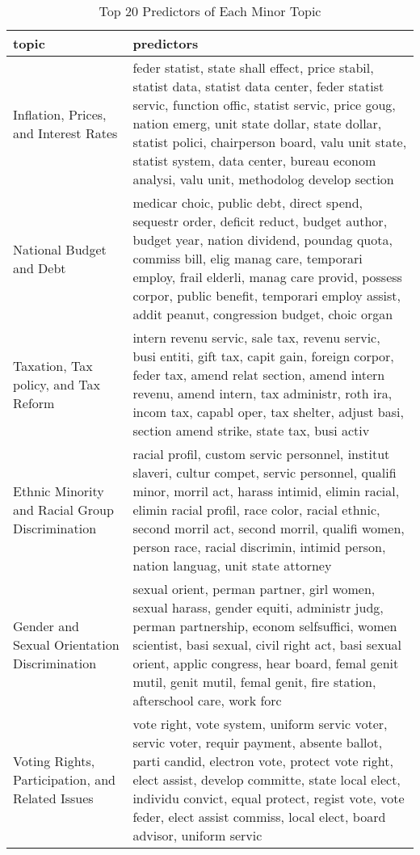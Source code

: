 \begingroup\tiny
\begin{longtable}{p{}p{}}
\caption{Top 20 Predictors of Each Minor Topic} \\ 
  \hline
topic & predictors \\ 
  \hline
Inflation, Prices, and Interest Rates & feder statist, state shall effect, price stabil, statist data, statist data center, feder statist servic, function offic, statist servic, price goug, nation emerg, unit state dollar, state dollar, statist polici, chairperson board, valu unit state, statist system, data center, bureau econom analysi, valu unit, methodolog develop section \\ 
   \hline
National Budget and Debt & medicar choic, public debt, direct spend, sequestr order, deficit reduct, budget author, budget year, nation dividend, poundag quota, commiss bill, elig manag care, temporari employ, frail elderli, manag care provid, possess corpor, public benefit, temporari employ assist, addit peanut, congression budget, choic organ \\ 
   \hline
Taxation, Tax policy, and Tax Reform & intern revenu servic, sale tax, revenu servic, busi entiti, gift tax, capit gain, foreign corpor, feder tax, amend relat section, amend intern revenu, amend intern, tax administr, roth ira, incom tax, capabl oper, tax shelter, adjust basi, section amend strike, state tax, busi activ \\ 
   \hline
Ethnic Minority and Racial Group Discrimination & racial profil, custom servic personnel, institut slaveri, cultur compet, servic personnel, qualifi minor, morril act, harass intimid, elimin racial, elimin racial profil, race color, racial ethnic, second morril act, second morril, qualifi women, person race, racial discrimin, intimid person, nation languag, unit state attorney \\ 
   \hline
Gender and Sexual Orientation Discrimination & sexual orient, perman partner, girl women, sexual harass, gender equiti, administr judg, perman partnership, econom selfsuffici, women scientist, basi sexual, civil right act, basi sexual orient, applic congress, hear board, femal genit mutil, genit mutil, femal genit, fire station, afterschool care, work forc \\ 
   \hline
Voting Rights, Participation, and Related Issues & vote right, vote system, uniform servic voter, servic voter, requir payment, absente ballot, parti candid, electron vote, protect vote right, elect assist, develop committe, state local elect, individu convict, equal protect, regist vote, vote feder, elect assist commiss, local elect, board advisor, uniform servic \\ 

\end{longtable}
